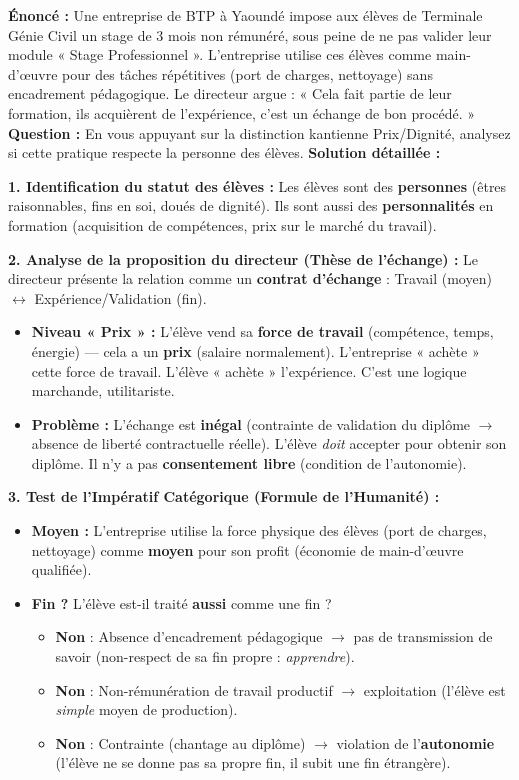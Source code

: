 \documentclass[11pt]{article}
\begin{document}
\begin{exoresolu}
\textbf{Énoncé :} Une entreprise de BTP à Yaoundé impose aux élèves de Terminale Génie Civil un stage de 3 mois non rémunéré, sous peine de ne pas valider leur module « Stage Professionnel ». L'entreprise utilise ces élèves comme main-d'œuvre pour des tâches répétitives (port de charges, nettoyage) sans encadrement pédagogique. Le directeur argue : « Cela fait partie de leur formation, ils acquièrent de l'expérience, c'est un échange de bon procédé. »
\textbf{Question :} En vous appuyant sur la distinction kantienne Prix/Dignité, analysez si cette pratique respecte la personne des élèves.
\tcblower
\textbf{Solution détaillée :}

\textbf{1. Identification du statut des élèves :}
Les élèves sont des \textbf{personnes} (êtres raisonnables, fins en soi, doués de dignité). Ils sont aussi des \textbf{personnalités} en formation (acquisition de compétences, prix sur le marché du travail).

\textbf{2. Analyse de la proposition du directeur (Thèse de l'échange) :}
Le directeur présente la relation comme un \textbf{contrat d'échange} : Travail (moyen) $\leftrightarrow$ Expérience/Validation (fin).
\begin{itemize}
    \item \textbf{Niveau « Prix » :} L'élève vend sa \textbf{force de travail} (compétence, temps, énergie) — cela a un \textbf{prix} (salaire normalement). L'entreprise « achète » cette force de travail. L'élève « achète » l'expérience. C'est une logique marchande, utilitariste.
    \item \textbf{Problème :} L'échange est \textbf{inégal} (contrainte de validation du diplôme $\to$ absence de liberté contractuelle réelle). L'élève \emph{doit} accepter pour obtenir son diplôme. Il n'y a pas \textbf{consentement libre} (condition de l'autonomie).
\end{itemize}

\textbf{3. Test de l'Impératif Catégorique (Formule de l'Humanité) :}
\begin{itemize}
    \item \textbf{Moyen :} L'entreprise utilise la force physique des élèves (port de charges, nettoyage) comme \textbf{moyen} pour son profit (économie de main-d'œuvre qualifiée).
    \item \textbf{Fin ?} L'élève est-il traité \textbf{aussi} comme une fin ?
    \begin{itemize}
        \item \textbf{Non} : Absence d'encadrement pédagogique $\to$ pas de transmission de savoir (non-respect de sa fin propre : \emph{apprendre}).
        \item \textbf{Non} : Non-rémunération de travail productif $\to$ exploitation (l'élève est \emph{simple} moyen de production).
        \item \textbf{Non} : Contrainte (chantage au diplôme) $\to$ violation de l'\textbf{autonomie} (l'élève ne se donne pas sa propre fin, il subit une fin étrangère).
    \end{itemize}
\end{itemize}


\end{exoresolu}
\end{document}

